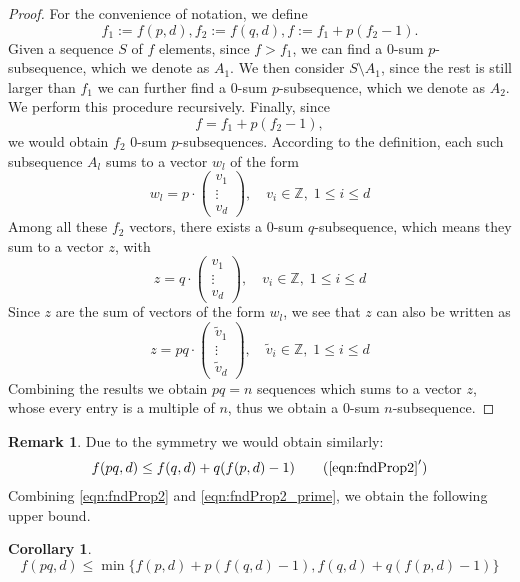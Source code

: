\documentclass[12pt]{article}
\theoremstyle{definition}
\newtheorem{corollary}[theorem]{Corollary}
\newtheorem{remark}[theorem]{Remark}
\numberwithin{equation}{theorem}
\numberwithin{figure}{theorem}
\newcommand{\Integer}{\ensuremath{\mathbb{Z}}}
\newcommand{\zeroSumSeq}[1]{$0$-sum $#1$-subsequence}
\newcommand{\fnd}[2]{\ensuremath{f(#1,#2)}}
\begin{document}
    \begin{proof}
        For the convenience of notation, we define 
        \[f_1 := \fnd{p}{d}, f_2 := \fnd{q}{d}, f := f_1 + p(f_2 - 1).\]
        Given a sequence $S$ of $f$ elements, 
        since $f > f_1$, we can find a \zeroSumSeq{p}, 
        which we denote as $A_1$.
        We then consider $S \setminus A_1$, since 
        the rest is still larger than $f_1$ we can 
        further find a \zeroSumSeq{p}, which we denote 
        as $A_2$.
        We perform this procedure recursively. Finally, 
        since 
        \[f = f_1 + p (f_2 - 1),\]
        we would obtain $f_2$ \zeroSumSeq{p}s. According to the definition, each such subsequence $A_l$ sums to a vector $w_l$ of the form
        \begin{equation*}\label{eqn:fnd_pq_p_sumVec}
            w_l = p \cdot \begin{pmatrix}
            v_1\\
            \vdots\\
            v_d
        \end{pmatrix}, \quad v_i \in \Integer, \; 1 \leq i \leq d
        \end{equation*}
        Among all these $f_2$ vectors, there exists a \zeroSumSeq{q}, which means 
        they sum to a vector $z$, with
        \[z = q \cdot \begin{pmatrix}
            v_1\\
            \vdots\\
            v_d
        \end{pmatrix}, \quad v_i \in \Integer, \; 1 \leq i \leq d\]
        Since $z$ are the sum of vectors of the form $w_l$, we see that $z$ can also be written as
        \[
            z = pq \cdot \begin{pmatrix}
                \tilde{v}_1\\
                \vdots\\
                \tilde{v}_d
            \end{pmatrix}, \quad \tilde{v}_i \in \Integer, \; 1 \leq i \leq d\]
        Combining the results we obtain $pq = n$ sequences which sums to a vector $z$, whose every 
        entry is a multiple of $n$, thus we obtain a \zeroSumSeq{n}.
    \end{proof}
    \begin{remark}
        Due to the symmetry we would obtain similarly:
        \begin{align}\label{eqn:fndProp2_prime}
            \fnd{pq}{d} \leq \fnd{q}{d} + q(\fnd{p}{d} - 1)\tag{$\ref{eqn:fndProp2}^\prime$}
        \end{align}
        Combining \eqref{eqn:fndProp2} and \eqref{eqn:fndProp2_prime}, we obtain the following upper bound.
    \end{remark}
    \begin{corollary}\label{cor:fnd_pq_Bound}
        \begin{equation}\label{eqn:fnd_pq_Bound}
            \fnd{pq}{d} \leq \min \{\fnd{p}{d} + p(\fnd{q}{d} - 1),  \fnd{q}{d} + q(\fnd{p}{d} - 1)\}
        \end{equation}
    \end{corollary}
    
\end{document}
